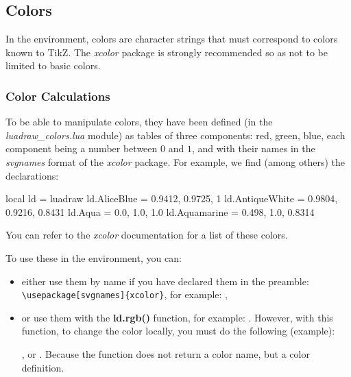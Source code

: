 \subsection{Colors}

In the \luadrawenv environment, colors are character strings that must correspond to colors known to TikZ. The \emph{xcolor} package is strongly recommended so as not to be limited to basic colors.

\subsubsection{Color Calculations}

To be able to manipulate colors, they have been defined (in the \emph{luadraw\_colors.lua} module) as tables of three components: red, green, blue, each component being a number between $0$ and $1$, and with their names in the \emph{svgnames} format of the \emph{xcolor} package. For example, we find (among others) the declarations:

\begin{Luacode}
local ld = luadraw
ld.AliceBlue = {0.9412, 0.9725, 1}
ld.AntiqueWhite = {0.9804, 0.9216, 0.8431}
ld.Aqua = {0.0, 1.0, 1.0}
ld.Aquamarine = {0.498, 1.0, 0.8314}
\end{Luacode}
You can refer to the \emph{xcolor} documentation for a list of these colors.

To use these in the \luadrawenv environment, you can:
\begin{itemize}
    \item either use them by name if you have declared them in the preamble: \verb|\usepackage[svgnames]{xcolor}|, for example: ,

    \item or use them with the \luadrawenv \textbf{ld.rgb()} function, for example: . However, with this  function, to change the color locally, you must do the following (example): \par
{}, or . Because the  function does not return a color name, but a color definition.
\end{itemize}

